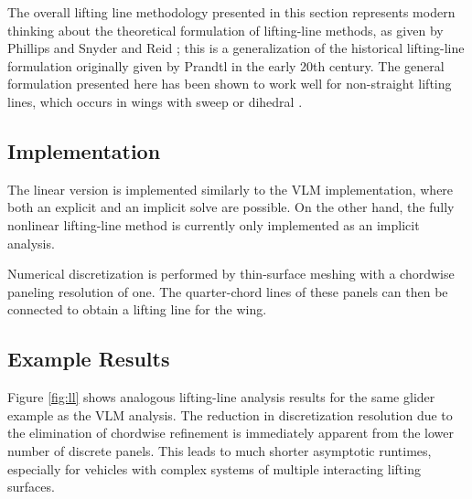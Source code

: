 
The overall lifting line methodology presented in this section represents modern thinking about the theoretical formulation of lifting-line methods, as given by Phillips and Snyder \cite{phillips_modern_2000} and Reid \cite{reid_general_2020}; this is a generalization of the historical lifting-line formulation originally given by Prandtl in the early 20th century. The general formulation presented here has been shown to work well for non-straight lifting lines, which occurs in wings with sweep or dihedral \cite{reid_general_2020, jacobs_extension_2012, phillips_liftingline_, phillips_modern_2000}.

\subsection{Implementation}


The linear version is implemented similarly to the VLM implementation, where both an explicit and an implicit solve are possible. On the other hand, the fully nonlinear lifting-line method is currently only implemented as an implicit analysis.

Numerical discretization is performed by thin-surface meshing with a chordwise paneling resolution of one. The quarter-chord lines of these panels can then be connected to obtain a lifting line for the wing.

\subsection{Example Results}

Figure \ref{fig:ll} shows analogous lifting-line analysis results for the same glider example as the VLM analysis. The reduction in discretization resolution due to the elimination of chordwise refinement is immediately apparent from the lower number of discrete panels. This leads to much shorter asymptotic runtimes, especially for vehicles with complex systems of multiple interacting lifting surfaces.

